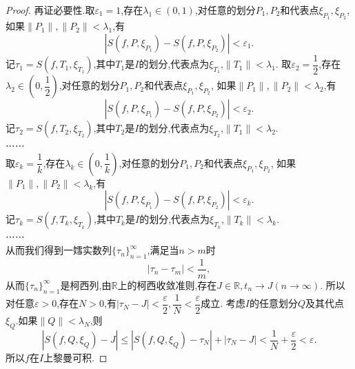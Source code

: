 \documentclass[a4paper,12pt]{article}
\begin{document}
{\begin{proof}
                    再证必要性.取$\varepsilon_1=1$,存在$\lambda_1\in(0,1)$,对任意的划分$P_1,P_2$和代表点$\xi_{P_1},\xi_{P_2}$,
                    如果$\|P_1\|,\|P_2\|<\lambda_1$,有$$|S(f,P,\xi_{P_1})-S(f,P,\xi_{P_2})|<\varepsilon_1.$$
                    记$\tau_1=S(f,T_1,\xi_{T_1})$,其中$T_1$是$I$的划分,代表点为$\xi_{T_1}$,$\|T_1\|<\lambda_1$.
                    取$\varepsilon_2=\dfrac{1}{2}$,存在$\lambda_2\in\left(0,\dfrac{1}{2}\right)$,对任意的划分$P_1,P_2$和代表点$\xi_{P_1},\xi_{P_2}$,
                    如果$\|P_1\|,\|P_2\|<\lambda_2$,有$$|S(f,P,\xi_{P_1})-S(f,P,\xi_{P_2})|<\varepsilon_2.$$
                    记$\tau_2=S(f,T_2,\xi_{T_2})$,其中$T_2$是$I$的划分,代表点为$\xi_{T_2}$,$\|T_1\|<\lambda_2$.\\
                    ⋯⋯\\
                    取$\varepsilon_k=\dfrac{1}{k}$,存在$\lambda_k\in\left(0,\dfrac{1}{k}\right)$,对任意的划分$P_1,P_2$和代表点$\xi_{P_1},\xi_{P_2}$,
                    如果$\|P_1\|,\|P_2\|<\lambda_k$,有$$|S(f,P,\xi_{P_1})-S(f,P,\xi_{P_2})|<\varepsilon_k.$$
                    记$\tau_k=S(f,T_k,\xi_{T_k})$,其中$T_k$是$I$的划分,代表点为$\xi_{T_k}$,$\|T_k\|<\lambda_k$.\\
                    ⋯⋯\\
                    从而我们得到一𡠭实数列$\{\tau_n\}_{n=1}^\infty$,满足当$n>m$时$$|\tau_n-\tau_m|<\dfrac{1}{m},$$
                    从而$\{\tau_n\}_{n=1}^\infty$是柯西列,由$\mathbb{R}$上的柯西收敛准则,存在$J\in\mathbb{R},t_n\to J(n\to\infty)$.
                    所以对任意$\varepsilon>0$,存在$N>0$,有$|\tau_N-J|<\dfrac{\varepsilon}{2},\dfrac{1}{N}<\dfrac{\varepsilon}{2}$成立.
                    考虑$I$的任意划分$Q$及其代点$\xi_Q$.如果$\|Q\|<\lambda_N$,则
                    $$|S(f,Q,\xi_Q)-J|\leqslant|S(f,Q,\xi_Q)-\tau_N|+|\tau_N-J|<\dfrac{1}{N}+\dfrac{\varepsilon}{2}<\varepsilon.$$
                    所以$f$在$I$上黎曼可积.
                \end{proof}
}
\end{document}
